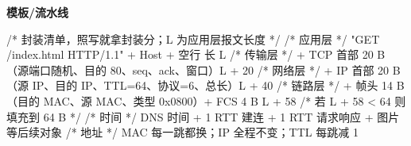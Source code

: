 \documentclass[10pt,a4paper]{ctexart}
\begin{document}
\textbf{模板/流水线}

\begin{codebox}
/* 封装清单，照写就拿封装分；L 为应用层报文长度 */
/* 应用层 */  "GET /index.html HTTP/1.1" + Host + 空行            长 L
/* 传输层 */  + TCP 首部 20 B（源端口随机、目的 80、seq、ack、窗口）L + 20
/* 网络层 */  + IP 首部 20 B（源 IP、目的 IP、TTL=64、协议=6、总长）L + 40
/* 链路层 */  + 帧头 14 B（目的 MAC、源 MAC、类型 0x0800）+ FCS 4 B  L + 58
/*            若 L + 58 < 64 则填充到 64 B */
/* 时间   */  DNS 时间 + 1 RTT 建连 + 1 RTT 请求响应 + 图片等后续对象
/* 地址   */  MAC 每一跳都换；IP 全程不变；TTL 每跳减 1
\end{codebox}

\end{document}

